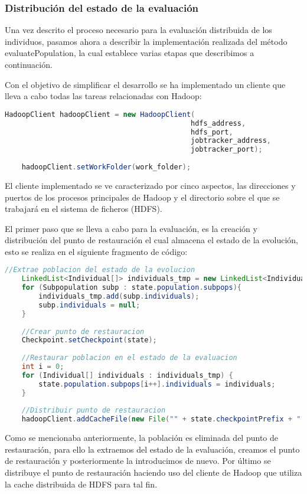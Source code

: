 \subsubsection{Distribución del estado de la evaluación}

Una vez descrito el proceso necesario para la evaluación distribuida de los individuos, pasamos ahora a describir la implementación realizada del método evaluatePopulation, la cual establece varias etapas que describimos a continuación.

Con el objetivo de simplificar el desarrollo se ha implementado un cliente que lleva a cabo todas las tareas relacionadas con Hadoop:

\begin{lstlisting}[language=Java]
	HadoopClient hadoopClient = new HadoopClient(
											hdfs_address,
											hdfs_port,
											jobtracker_address,
											jobtracker_port);
			
	hadoopClient.setWorkFolder(work_folder);
\end{lstlisting}

El cliente implementado se ve caracterizado por cinco aspectos, las direcciones y puertos de los procesos principales de Hadoop y el directorio sobre el que se trabajar\'a en el sistema de ficheros (HDFS).

El primer paso que se lleva a cabo para la evaluación, es la creación y distribución del punto de restauración el cual almacena el estado de la evolución, esto se realiza en el siguiente fragmento de código:

\begin{lstlisting}[language=Java]
	//Extrae poblacion del estado de la evolucion
	LinkedList<Individual[]> individuals_tmp = new LinkedList<Individual[]>();
	for (Subpopulation subp : state.population.subpops){
		individuals_tmp.add(subp.individuals);
		subp.individuals = null;
	}
	
	//Crear punto de restauracion
	Checkpoint.setCheckpoint(state);
	
	//Restaurar poblacion en el estado de la evaluacion
	int i = 0;
	for (Individual[] individuals : individuals_tmp) {
		state.population.subpops[i++].individuals = individuals;
	}
			
	//Distribuir punto de restauracion
	hadoopClient.addCacheFile(new File("" + state.checkpointPrefix + "." + state.generation + ".gz"), true, true);
\end{lstlisting}

Como se mencionaba anteriormente, la población es eliminada del punto de restauración, para ello la extraemos del estado de la evaluación, creamos el punto de restauración y posteriormente la introducimos de nuevo. Por \'ultimo se distribuye el punto de restauración haciendo uso del cliente de Hadoop que utiliza la cache distribuida de HDFS para tal fin.

